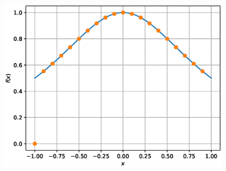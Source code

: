 \documentclass[journal,12pt,twocolumn]{IEEEtran}
\begin{document}
\begin{figure}[!ht]
\begin{center}
\includegraphics[width=\columnwidth]{./figs/6.eps}
\end{center}
\label{fig:3}	
\end{figure}
\end{document}

